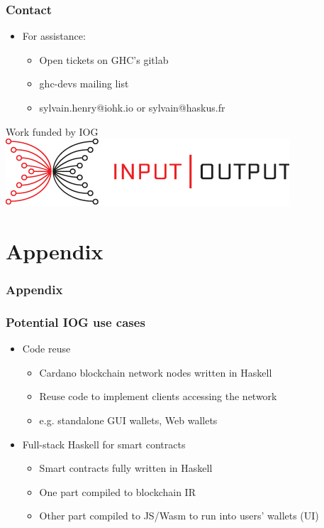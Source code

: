 \documentclass[aspectratio=169]{beamer}
\begin{document}
\begin{frame}
\frametitle{Contact}
  \begin{itemize}
    \item For assistance:
      \begin{itemize}
        \item Open tickets on GHC's gitlab
        \item ghc-devs mailing list
        \item sylvain.henry@iohk.io or sylvain@haskus.fr
      \end{itemize}
  \end{itemize}
  \vspace{2cm}
  \begin{center}
  Work funded by IOG\\\includegraphics[scale=0.3]{images/iohk-logo.png}
  \end{center}
\end{frame}

\appendix

\section*{Appendix}

\begin{frame}[noframenumbering]
  \frametitle{Appendix}
\end{frame}

\begin{frame}[noframenumbering]
\frametitle{Potential IOG use cases}
\begin{itemize}
\item Code reuse
\begin{itemize}
\item Cardano blockchain network nodes written in Haskell
\item Reuse code to implement clients accessing the network
\item e.g. standalone GUI wallets, Web wallets
\end{itemize}
\item Full-stack Haskell for smart contracts
\begin{itemize}
\item Smart contracts fully written in Haskell
\item One part compiled to blockchain IR
\item Other part compiled to JS/Wasm to run into users’ wallets (UI)
\end{itemize}
\end{itemize}
\end{frame}
\end{document}

